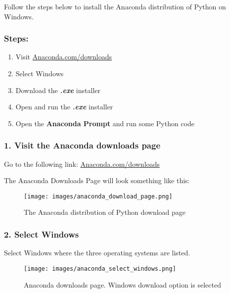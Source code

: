 \documentclass{book}
\makeatletter
\def\maxwidth{\ifdim\Gin@nat@width>\linewidth\linewidth
\else\Gin@nat@width\fi}
\let\Oldincludegraphics\includegraphics
\renewcommand{\includegraphics}[1]{\Oldincludegraphics[width=.8\maxwidth]{#1}}
\makeatother
\begin{document}
Follow the steps below to install the Anaconda distribution of Python on
Windows.

\hypertarget{steps}{%
\subsubsection{Steps:}\label{steps}}

\begin{enumerate}
\def\labelenumi{\arabic{enumi}.}
\item
  Visit
  \href{https://www.anaconda.com/download/}{Anaconda.com/downloads}
\item
  Select Windows
\item
  Download the \textbf{\emph{.exe}} installer
\item
  Open and run the \textbf{\emph{.exe}} installer
\item
  Open the \textbf{Anaconda Prompt} and run some Python code
\end{enumerate}
    




    
        \hypertarget{visit-the-anaconda-downloads-page}{%
\subsubsection{1. Visit the Anaconda downloads
page}\label{visit-the-anaconda-downloads-page}}

Go to the following link:
\href{https://www.anaconda.com/download/}{Anaconda.com/downloads}

The Anaconda Downloads Page will look something like this:

\begin{figure}
\centering
\texttt{[image: images/anaconda\_download\_page.png]}
\caption{The Anaconda distribution of Python download page}
\end{figure}
    




    
        \hypertarget{select-windows}{%
\subsubsection{2. Select Windows}\label{select-windows}}

Select Windows where the three operating systems are listed.

\begin{figure}
\centering
\texttt{[image: images/anaconda\_select\_windows.png]}
\caption{Anaconda downloads page. Windows download option is selected}
\end{figure}
    
\end{document}
